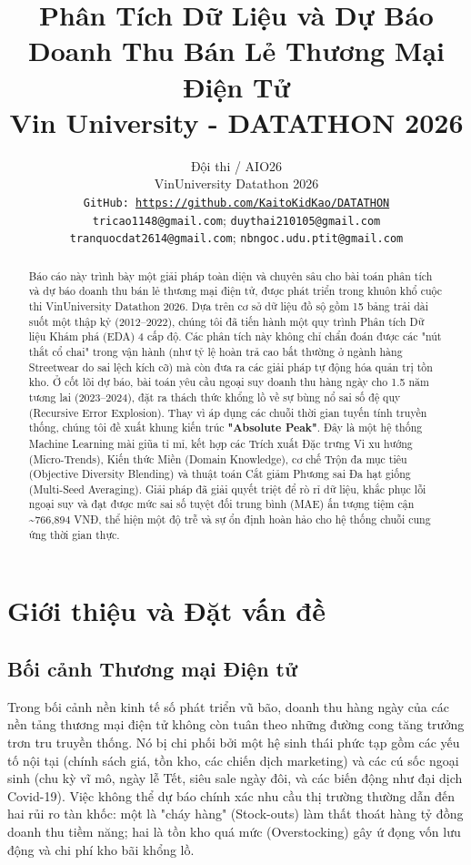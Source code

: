\documentclass{article}
\title{Phân Tích Dữ Liệu và Dự Báo Doanh Thu Bán Lẻ Thương Mại Điện Tử\\Vin University - DATATHON 2026 }
\author{%
  Đội thi / AIO26 \\
  VinUniversity Datathon 2026\\
  \texttt{GitHub: \url{https://github.com/KaitoKidKao/DATATHON}} \\
  \texttt{tricao1148@gmail.com}; \texttt{duythai210105@gmail.com} \\
  \texttt{tranquocdat2614@gmail.com}; \texttt{nbngoc.udu.ptit@gmail.com}
}
\begin{document}
\maketitle

\begin{abstract}
Báo cáo này trình bày một giải pháp toàn diện và chuyên sâu cho bài toán phân tích và dự báo doanh thu bán lẻ thương mại điện tử, được phát triển trong khuôn khổ cuộc thi VinUniversity Datathon 2026. Dựa trên cơ sở dữ liệu đồ sộ gồm 15 bảng trải dài suốt một thập kỷ (2012--2022), chúng tôi đã tiến hành một quy trình Phân tích Dữ liệu Khám phá (EDA) 4 cấp độ. Các phân tích này không chỉ chẩn đoán được các "nút thắt cổ chai" trong vận hành (như tỷ lệ hoàn trả cao bất thường ở ngành hàng Streetwear do sai lệch kích cỡ) mà còn đưa ra các giải pháp tự động hóa quản trị tồn kho. Ở cốt lõi dự báo, bài toán yêu cầu ngoại suy doanh thu hàng ngày cho 1.5 năm tương lai (2023--2024), đặt ra thách thức khổng lồ về sự bùng nổ sai số đệ quy (Recursive Error Explosion). Thay vì áp dụng các chuỗi thời gian tuyến tính truyền thống, chúng tôi đề xuất khung kiến trúc \textbf{"Absolute Peak"}. Đây là một hệ thống Machine Learning mài giũa tỉ mỉ, kết hợp các Trích xuất Đặc trưng Vi xu hướng (Micro-Trends), Kiến thức Miền (Domain Knowledge), cơ chế Trộn đa mục tiêu (Objective Diversity Blending) và thuật toán Cắt giảm Phương sai Đa hạt giống (Multi-Seed Averaging). Giải pháp đã giải quyết triệt để rò rỉ dữ liệu, khắc phục lỗi ngoại suy và đạt được mức sai số tuyệt đối trung bình (MAE) ấn tượng tiệm cận \textasciitilde 766,894 VNĐ, thể hiện một độ trễ và sự ổn định hoàn hảo cho hệ thống chuỗi cung ứng thời gian thực.
\end{abstract}

\section{Giới thiệu và Đặt vấn đề}

\subsection{Bối cảnh Thương mại Điện tử}
Trong bối cảnh nền kinh tế số phát triển vũ bão, doanh thu hàng ngày của các nền tảng thương mại điện tử không còn tuân theo những đường cong tăng trưởng trơn tru truyền thống. Nó bị chi phối bởi một hệ sinh thái phức tạp gồm các yếu tố nội tại (chính sách giá, tồn kho, các chiến dịch marketing) và các cú sốc ngoại sinh (chu kỳ vĩ mô, ngày lễ Tết, siêu sale ngày đôi, và các biến động như đại dịch Covid-19). Việc không thể dự báo chính xác nhu cầu thị trường thường dẫn đến hai rủi ro tàn khốc: một là "cháy hàng" (Stock-outs) làm thất thoát hàng tỷ đồng doanh thu tiềm năng; hai là tồn kho quá mức (Overstocking) gây ứ đọng vốn lưu động và chi phí kho bãi khổng lồ.
\end{document}
